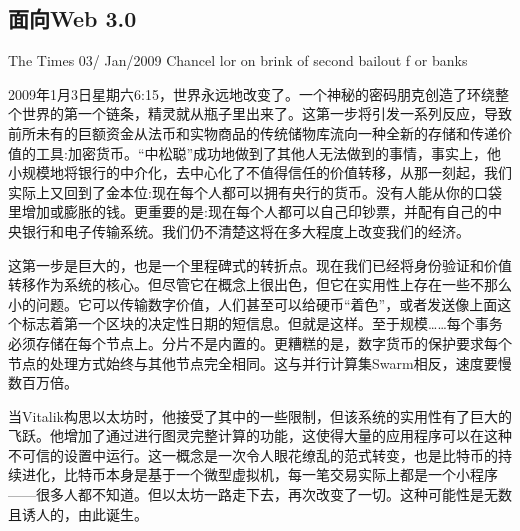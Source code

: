 \subsection{面向Web 3.0 \statusgreen}\label{sec:towards-web3}


\begin{centerverbatim}
The Times 03/
Jan/2009 Chancel
lor on brink of 
second bailout f
or banks    
\end{centerverbatim}

2009年1月3日星期六6:15，世界永远地改变了。一个神秘的密码朋克创造了环绕整个世界的第一个链条，精灵就从瓶子里出来了。这第一步将引发一系列反应，导致前所未有的巨额资金从法币和实物商品的传统储物库流向一种全新的存储和传递价值的工具:加密货币。“中松聪”成功地做到了其他人无法做到的事情，事实上，他小规模地将银行的中介化，去中心化了不值得信任的价值转移，从那一刻起，我们实际上又回到了金本位:现在每个人都可以拥有央行的货币。没有人能从你的口袋里增加或膨胀的钱。更重要的是:现在每个人都可以自己印钞票，并配有自己的中央银行和电子传输系统。我们仍不清楚这将在多大程度上改变我们的经济。

这第一步是巨大的，也是一个里程碑式的转折点。现在我们已经将身份验证和价值转移作为系统的核心。但尽管它在概念上很出色，但它在实用性上存在一些不那么小的问题。它可以传输数字价值，人们甚至可以给硬币“着色”，或者发送像上面这个标志着第一个区块的决定性日期的短信息。但就是这样。至于规模……每个事务必须存储在每个节点上。分片不是内置的。更糟糕的是，数字货币的保护要求每个节点的处理方式始终与其他节点完全相同。这与并行计算集Swarm相反，速度要慢数百万倍。

当Vitalik构思以太坊时，他接受了其中的一些限制，但该系统的实用性有了巨大的飞跃。他增加了通过进行图灵完整计算的功能，这使得大量的应用程序可以在这种不可信的设置中运行。这一概念是一次令人眼花缭乱的范式转变，也是比特币的持续进化，比特币本身是基于一个微型虚拟机，每一笔交易实际上都是一个小程序——很多人都不知道。但以太坊一路走下去，再次改变了一切。这种可能性是无数且诱人的，由此诞生。

